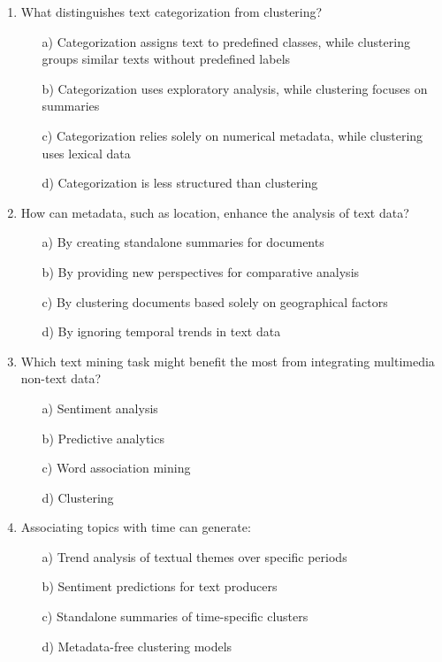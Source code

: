 \documentclass[8pt]{extarticle}
\begin{document}
\begin{multicols}{2}
\begin{enumerate}
\item What distinguishes text categorization from clustering?
\begin{itemize}
\item[a)] Categorization assigns text to predefined classes, while clustering groups similar texts without predefined labels
\item[b)] Categorization uses exploratory analysis, while clustering focuses on summaries
\item[c)] Categorization relies solely on numerical metadata, while clustering uses lexical data
\item[d)] Categorization is less structured than clustering
\end{itemize}

\item How can metadata, such as location, enhance the analysis of text data?
\begin{itemize}
\item[a)] By creating standalone summaries for documents
\item[b)] By providing new perspectives for comparative analysis
\item[c)] By clustering documents based solely on geographical factors
\item[d)] By ignoring temporal trends in text data
\end{itemize}

\item Which text mining task might benefit the most from integrating multimedia non-text data?
\begin{itemize}
\item[a)] Sentiment analysis
\item[b)] Predictive analytics
\item[c)] Word association mining
\item[d)] Clustering
\end{itemize}

\item Associating topics with time can generate:
\begin{itemize}
\item[a)] Trend analysis of textual themes over specific periods
\item[b)] Sentiment predictions for text producers
\item[c)] Standalone summaries of time-specific clusters
\item[d)] Metadata-free clustering models
\end{itemize}


\end{enumerate}
\end{multicols}
\end{document}
